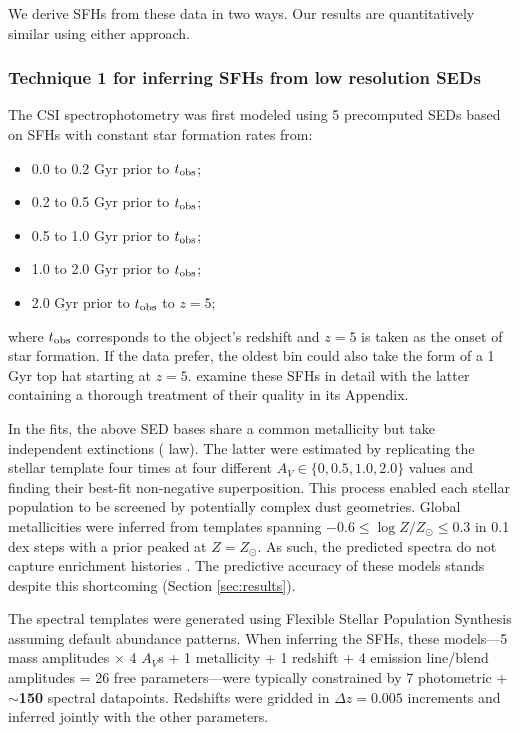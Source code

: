 \documentclass[a4paper,fleqn,usenatbib]{mnras}
\newcommand{\logZ}{\log Z/Z_{\odot}}
\newcommand{\bfr}{\bf\color{red}}
\newcommand{\tobs}{t_{\rm obs}}
\newcommand{\bitem}{\begin{itemize}}
\newcommand{\eitem}{\end{itemize}}
\begin{document}
We derive SFHs from these data in two ways. Our results are quantitatively similar
using either approach.


\subsubsection{Technique 1 for inferring SFHs from low resolution SEDs}
\label{sec:blocks}

The CSI spectrophotometry was first modeled using 5 precomputed SEDs based on SFHs with 
constant star formation rates from:
\bitem
	\item 0.0 to 0.2 Gyr prior to $\tobs$;
	\item 0.2 to 0.5 Gyr prior to $\tobs$;
	\item 0.5 to 1.0 Gyr prior to $\tobs$;
	\item 1.0 to 2.0 Gyr prior to $\tobs$;
	\item 2.0 Gyr prior to $\tobs$ to $z=5$;
\eitem
where $\tobs$ corresponds to the object's redshift and $z=5$ is taken as the onset of star formation. If 
the data prefer, the oldest bin could also take the form of a 1 Gyr top hat starting at $z=5$. 
\citet{Dressler16, Dressler18} examine these SFHs in detail with the latter containing a thorough 
treatment of their quality in its Appendix.

In the fits, the above SED bases share a common metallicity but take independent extinctions 
(\citealt{Calzetti00} law). The latter were estimated by replicating the stellar template four times
at four different {\bfr $A_{V}\in\{0,0.5,1.0,2.0\}$} values and finding their best-fit non-negative
superposition. This process enabled each stellar population to be screened by potentially complex 
dust geometries. Global metallicities were inferred from templates spanning 
$-0.6\leq\logZ\leq0.3$ in 0.1 dex steps with a prior peaked at $Z=Z_{\odot}$. 
As such, the predicted spectra do not capture enrichment 
histories \citep[cf.][]{Pacifici12, Morishita19}. The predictive accuracy of these models stands despite 
this shortcoming (Section \ref{sec:results}).

The spectral templates were generated using Flexible Stellar Population Synthesis 
\citep[FSPS;][]{ConroyGunnWhite09} assuming default abundance patterns. When inferring the SFHs, 
these models---5 mass amplitudes $\times$ 4 $A_{V}$s + 1 metallicity + 1 redshift + 4 emission line/blend 
amplitudes = 26 free parameters---were typically constrained by 
7 photometric + {\bfr $\sim$150} spectral datapoints. Redshifts were gridded in $\Delta z = 0.005$ 
increments and inferred jointly with the other parameters.
\end{document}
